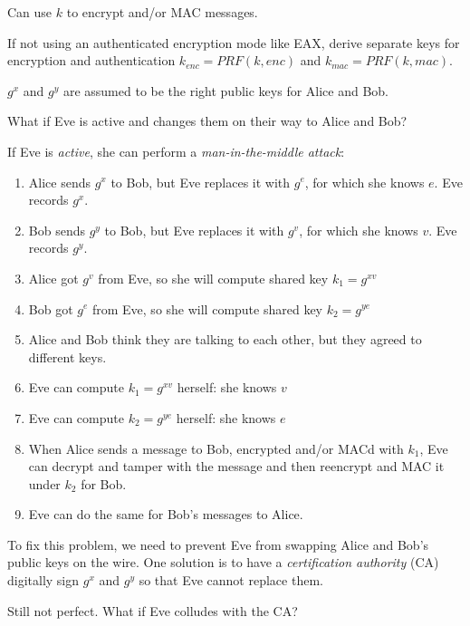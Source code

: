 \documentclass[12pt]{article}
\begin{document}
\begin{note}
Can use $k$ to encrypt and/or MAC messages.
\end{note}

\begin{note}
If not using an authenticated encryption mode like EAX, derive separate keys
for encryption and authentication $k_{enc} = PRF(k, enc)$ and $k_{mac} = PRF(k, mac)$.
\end{note}

\begin{note}
$g^x$ and $g^y$ are assumed to be the right public keys for Alice and Bob.
\end{note}

What if Eve is active and changes them on their way to Alice and Bob?

If Eve is \emph{active}, she can perform a \emph{man-in-the-middle attack}:

\begin{enumerate}
  \item Alice sends $g^x$ to Bob, but Eve replaces it with $g^e$, for which she
  knows $e$. Eve records $g^x$.
  \item Bob sends $g^y$ to Bob, but Eve replaces it with $g^v$, for which she
  knows $v$. Eve records $g^y$.
  \item Alice got $g^v$ from Eve, so she will compute shared key $k_1 = g^{xv}$
  \item Bob got $g^e$ from Eve, so she will compute shared key $k_2 = g^{ye}$
  \item Alice and Bob think they are talking to each other, but they agreed to
  different keys.
  \item Eve can compute $k_1 = g^{xv}$ herself: she knows $v$
  \item Eve can compute $k_2 = g^{ye}$ herself: she knows $e$
  \item When Alice sends a message to Bob, encrypted and/or MACd with $k_1$, Eve
  can decrypt and tamper with the message and then reencrypt and MAC it under $k_2$
  for Bob.
  \item Eve can do the same for Bob's messages to Alice.
\end{enumerate}

To fix this problem, we need to prevent Eve from swapping Alice and Bob's public
keys on the wire. One solution is to have a \emph{certification authority} (CA)
digitally sign $g^x$ and $g^y$ so that Eve cannot replace them.

\begin{note}
Still not perfect. What if Eve colludes with the CA?
\end{note}
\end{document}
